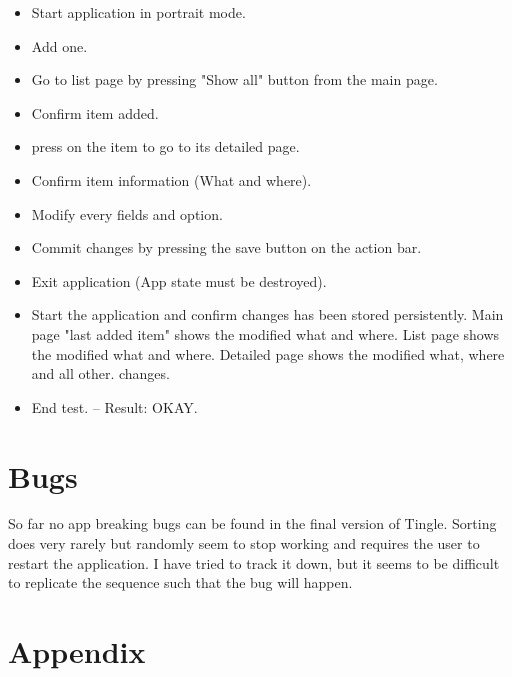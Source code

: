 \documentclass{article}
\begin{document}
\begin{itemize}
	\item Start application in portrait mode.
	\item Add one.
	\item Go to list page by pressing "Show all" button from the main page.
	\item Confirm item added.
	\item press on the item to go to its detailed page.
	\item Confirm item information (What and where).
	\item Modify every fields and option.
	\item Commit changes by pressing the save button on the action bar.
	\item Exit application (App state must be destroyed).
	\item Start the application and confirm changes has been stored persistently.
	\subitem Main page "last added item" shows the modified what and where.
	\subitem List page shows the modified what and where.
	\subitem Detailed page shows the modified what, where and all other. changes.
	\item End test. -- Result: OKAY.
\end{itemize}


\section{Bugs}
So far no app breaking bugs can be found in the final version of Tingle. Sorting does very rarely but randomly seem to stop working and requires the user to restart the application. I have tried to track it down, but it seems to be difficult to replicate the sequence such that the bug will happen. 

\newpage
\section{Appendix}
\end{document}

